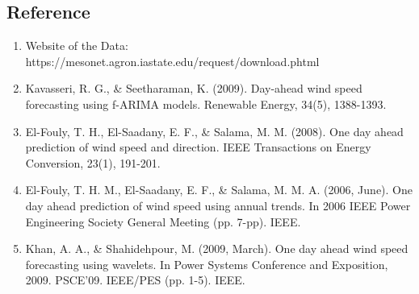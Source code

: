 \documentclass{article}
\begin{document}
\subsection*{Reference}
\begin{enumerate}
 \item Website of the Data: https://mesonet.agron.iastate.edu/request/download.phtml
 \item Kavasseri, R. G., \& Seetharaman, K. (2009). Day-ahead wind speed forecasting using f-ARIMA models. Renewable Energy, 34(5), 1388-1393.
 \item El-Fouly, T. H., El-Saadany, E. F., \& Salama, M. M. (2008). One day ahead prediction of wind speed and direction. IEEE Transactions on Energy Conversion, 23(1), 191-201.
 \item El-Fouly, T. H. M., El-Saadany, E. F., \& Salama, M. M. A. (2006, June). One day ahead prediction of wind speed using annual trends. In 2006 IEEE Power Engineering Society General Meeting (pp. 7-pp). IEEE.
 \item Khan, A. A., \& Shahidehpour, M. (2009, March). One day ahead wind speed forecasting using wavelets. In Power Systems Conference and Exposition, 2009. PSCE'09. IEEE/PES (pp. 1-5). IEEE.
\end{enumerate}
\end{document}
